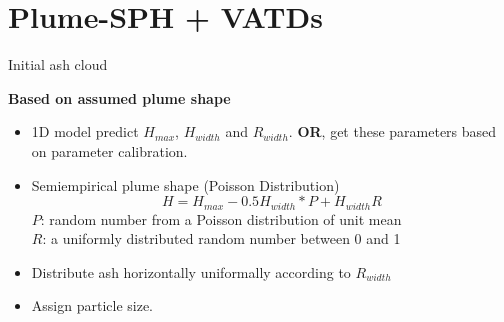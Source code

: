 \documentclass{beamer}
\begin{document}
\section{Plume-SPH + VATDs}
\begin{frame}{Initial ash cloud}
\begin{minipage}{.67\textwidth}
\textbf{Based on assumed plume shape}
\begin{itemize}
\item 1D model predict $H_{max}$, $H_{width}$ and $R_{width}$.  \textbf{OR}, get these parameters based on parameter calibration.
\item Semiempirical plume shape (Poisson Distribution)
\begin{equation}
H=H_{max} - 0.5 H_{width}*P+H_{width}R
\label{eq:Poisson-plume-shape}
\end{equation}
$P$: random number from a Poisson
distribution of unit mean \\ 
$R$: a uniformly distributed random number between 0 and 1
\item Distribute ash horizontally uniformally according to $R_{width}$
\item Assign particle size.
\end{itemize}
\end{minipage}
\noindent
\begin{minipage}{.32\textwidth}

\end{minipage}
\end{frame}
\end{document}
